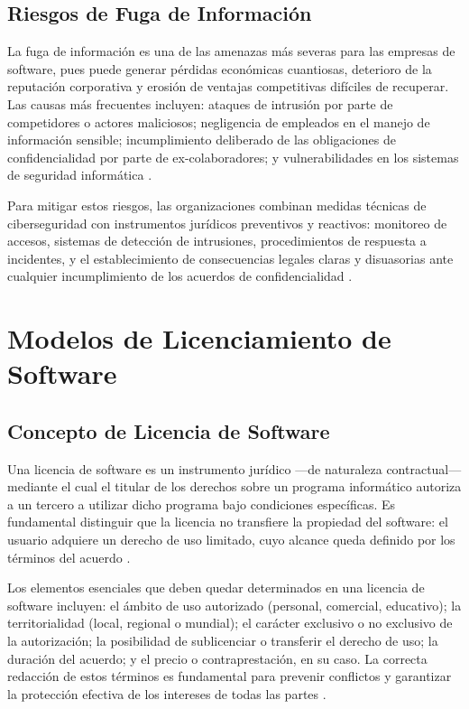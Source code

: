 \documentclass[11pt,a4paper]{report}
\begin{document}
\section{Riesgos de Fuga de Información}

La fuga de información es una de las amenazas más severas para las empresas de software, pues puede generar pérdidas económicas cuantiosas, deterioro de la reputación corporativa y erosión de ventajas competitivas difíciles de recuperar. Las causas más frecuentes incluyen: ataques de intrusión por parte de competidores o actores maliciosos; negligencia de empleados en el manejo de información sensible; incumplimiento deliberado de las obligaciones de confidencialidad por parte de ex-colaboradores; y vulnerabilidades en los sistemas de seguridad informática \citep{ompi2024}.

Para mitigar estos riesgos, las organizaciones combinan medidas técnicas de ciberseguridad con instrumentos jurídicos preventivos y reactivos: monitoreo de accesos, sistemas de detección de intrusiones, procedimientos de respuesta a incidentes, y el establecimiento de consecuencias legales claras y disuasorias ante cualquier incumplimiento de los acuerdos de confidencialidad \citep{euipo2022}.

\newpage

\chapter{Modelos de Licenciamiento de Software}

\section{Concepto de Licencia de Software}

Una licencia de software es un instrumento jurídico —de naturaleza contractual— mediante el cual el titular de los derechos sobre un programa informático autoriza a un tercero a utilizar dicho programa bajo condiciones específicas. Es fundamental distinguir que la licencia no transfiere la propiedad del software: el usuario adquiere un derecho de uso limitado, cuyo alcance queda definido por los términos del acuerdo \citep{ompi2024}.

Los elementos esenciales que deben quedar determinados en una licencia de software incluyen: el ámbito de uso autorizado (personal, comercial, educativo); la territorialidad (local, regional o mundial); el carácter exclusivo o no exclusivo de la autorización; la posibilidad de sublicenciar o transferir el derecho de uso; la duración del acuerdo; y el precio o contraprestación, en su caso. La correcta redacción de estos términos es fundamental para prevenir conflictos y garantizar la protección efectiva de los intereses de todas las partes \citep{euipo2022}.
\end{document}
